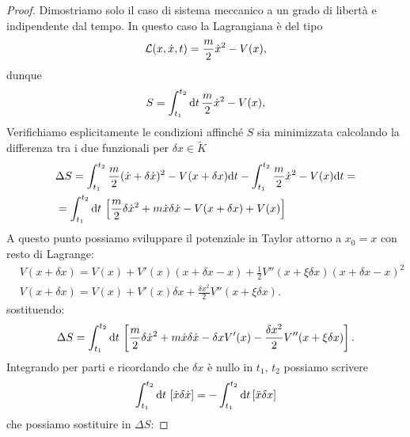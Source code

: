     \begin{proof}
        Dimostriamo solo il caso di sistema meccanico a un grado di libertà e indipendente dal tempo. In questo caso la Lagrangiana è del tipo
        \begin{equation}
            \mathcal{L}(x,\dot{x},t) = \frac{m}{2}\dot{x}^2-V(x),
        \end{equation}
        dunque
        \begin{equation}
            S = \int_{t_1}^{t_2} \mathrm{d} t\,\frac{m}{2}\dot{x}^2-V(x),
        \end{equation}
        Verifichiamo esplicitamente le condizioni affinché $S$ sia minimizzata calcolando la differenza tra i due funzionali per $\delta x\in \tilde{K}$
        \begin{equation}
        \begin{aligned}
            &\Delta S = \int_{t_1}^{t_2}\frac{m}{2}(\dot{x}+\delta\dot{x})^2-V(x+\delta x) \mathrm{d} t-\int_{t_1}^{t_2}\frac{m}{2}\dot{x}^2-V(x) \mathrm{d} t =\\
            &=\int_{t_1}^{t_2} \mathrm{d} t\,\left[  \frac{m}{2}\delta\dot{x}^2+m\dot{x}\delta\dot{x}-V(x+\delta x) + V(x) \right]
            \end{aligned}
        \end{equation}
        A questo punto possiamo sviluppare il potenziale in Taylor attorno a $x_0=x$ con resto di Lagrange:
        \begin{equation}
        \begin{aligned}
            &V(x+\delta x) = V(x)+V'(x)(x+\delta x-x)+\frac{1}{2}V''(x+\xi\delta x)(x+\delta x-x)^2\\
            &V(x+\delta x) = V(x) + V'(x)\delta x+\frac{\delta x^2}{2}V''(x+\xi\delta x).
        \end{aligned}
        \end{equation}
        sostituendo:
        \begin{equation}
            \Delta S = \int_{t_1}^{t_2} \mathrm{d} t\,\left[\frac{m}{2}\delta \dot{x}^2+m\dot{x}\delta\dot{x}-\delta xV'(x)-\frac{\delta x^2}{2}V''(x+\xi\delta x)\right].
        \end{equation}
        Integrando per parti e ricordando che $\delta x$ è nullo in $t_1,\,t_2$ possiamo scrivere
        \begin{equation}
            \int_{t_1}^{t_2} \mathrm{d} t\,\left[\dot{x}\delta\dot{x}\right] = -\int_{t_1}^{t_2}\mathrm{d} t\,[\ddot{x}\delta x]
        \end{equation}
        che possiamo sostituire in $\Delta S$:

\end{proof}
